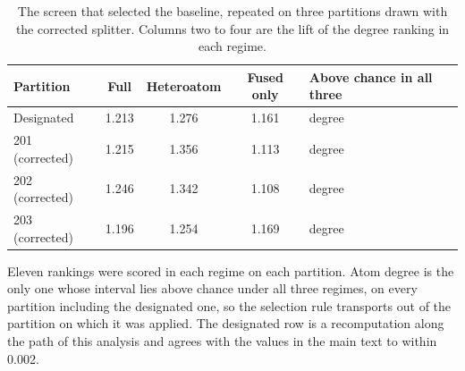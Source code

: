 \begin{table}[htbp]
\centering
\caption{The screen that selected the baseline, repeated on three partitions drawn with the corrected splitter. Columns two to four are the lift of the degree ranking in each regime.}
\label{tab:si_panel}
\small
\setlength{\tabcolsep}{4pt}
\begin{tabular}{lcccl}
\toprule
Partition & Full & Heteroatom & Fused only & Above chance in all three \\
\midrule
Designated & 1.213 & 1.276 & 1.161 & degree \\
201 (corrected) & 1.215 & 1.356 & 1.113 & degree \\
202 (corrected) & 1.246 & 1.342 & 1.108 & degree \\
203 (corrected) & 1.196 & 1.254 & 1.169 & degree \\
\bottomrule
\end{tabular}
\begin{flushleft}\footnotesize Eleven rankings were scored in each regime on each partition. Atom degree is the only one whose interval lies above chance under all three regimes, on every partition including the designated one, so the selection rule transports out of the partition on which it was applied. The designated row is a recomputation along the path of this analysis and agrees with the values in the main text to within 0.002.\end{flushleft}
\end{table}
